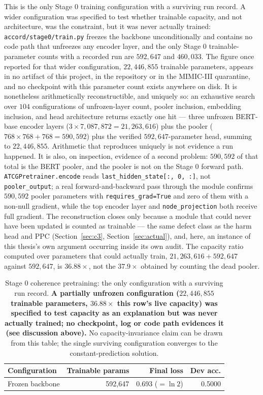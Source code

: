 This is the only Stage 0 training configuration with a surviving run record.
A wider configuration was specified to test whether trainable capacity, and
not architecture, was the constraint, but it was never actually trained:
\texttt{accord/stage0/train.py} freezes the backbone unconditionally and
contains no code path that unfreezes any encoder layer, and the only Stage 0
trainable-parameter counts with a recorded run are $592{,}647$ and
$460{,}033$. The figure once reported for that wider configuration,
$22{,}446{,}855$ trainable parameters, appears in no artifact of this
project, in the repository or in the MIMIC-III quarantine, and no checkpoint
with this parameter count exists anywhere on disk. It is nonetheless
arithmetically reconstructible, and uniquely so: an exhaustive search over
$104$ configurations of unfrozen-layer count, pooler inclusion, embedding
inclusion, and head architecture returns exactly one hit --- three unfrozen
BERT-base encoder layers ($3 \times 7{,}087{,}872 = 21{,}263{,}616$) plus the
pooler ($768 \times 768 + 768 = 590{,}592$) plus the verified
$592{,}647$-parameter head, summing to $22{,}446{,}855$. Arithmetic that
reproduces uniquely is not evidence a run happened. It is also, on
inspection, evidence of a second problem: $590{,}592$ of that total is the
BERT pooler, and the pooler is not on the Stage 0 forward path.
\texttt{ATCGPretrainer.encode} reads \texttt{last\_hidden\_state[:, 0, :]},
not \texttt{pooler\_output}; a real forward-and-backward pass through the
module confirms $590{,}592$ pooler parameters with
\texttt{requires\_grad=True} and zero of them with a non-null gradient, while
the top encoder layer and \texttt{node\_projection} both receive full
gradient. The reconstruction closes only because a module that could never
have been updated is counted as trainable --- the same defect class as the
harm head and PPC (Section~\ref{sec:c3}, Section~\ref{sec:actual}), and, here,
an instance of this thesis's own argument occurring inside its own audit. The
capacity ratio computed over parameters that could actually train,
$21{,}263{,}616 + 592{,}647$ against $592{,}647$, is $36.88\times$, not the
$37.9\times$ obtained by counting the dead pooler.

\begin{table}[h]
\centering
\small
\begin{tabular}{lrrr}
\toprule
\textbf{Configuration} & \textbf{Trainable params} & \textbf{Final loss} & \textbf{Dev acc.} \\
\midrule
Frozen backbone             & 592,647    & 0.693 ($=\ln 2$) & 0.5000 \\
\bottomrule
\end{tabular}
\caption{Stage 0 coherence pretraining: the only configuration with a
surviving run record. \textbf{A partially unfrozen configuration
($22{,}446{,}855$ trainable parameters, $36.88\times$ this row's live
capacity) was specified to test capacity as an explanation but was never
actually trained; no checkpoint, log or code path evidences it (see
discussion above).} No capacity-invariance claim can be drawn from this
table; the single surviving configuration converges to the
constant-prediction solution.}
\label{tab:stage0}
\end{table}

